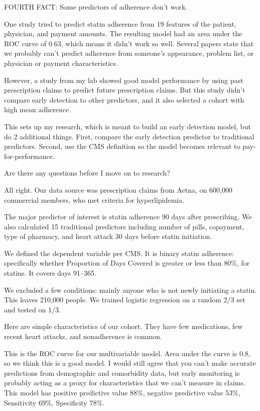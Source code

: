\documentclass[12pt]{report}
\begin{document}
\begin{large}
FOURTH FACT: Some predictors of adherence don't work. %

One study tried to predict statin adherence from 19 features of the
patient, physician, and payment amounts. The resulting model had an
area under the ROC curve of 0.63, which means it didn't work so well.
Several papers state that we probably can't predict adherence from
someone's appearance, problem list, or physician or payment
characteristics. %

However, a study from my lab showed good model performance by using
past prescription claims to predict future prescription claims. But
this study didn't compare early detection to other predictors, and it
also selected a cohort with high mean adherence. %

This sets up my research, which is meant to build an early detection
model, but do 2 additional things. First, compare the early detection
predictor to traditional predictors. Second, use the CMS definition so
the model becomes relevant to pay-for-performance.

Are there any questions before I move on to research?







All right. Our data source was prescription claims from Aetna, on
600,000 commercial members, who met criteria for hyperlipidemia. %

The major predictor of interest is statin adherence 90 days after
prescribing. We also calculated 15 traditional predictors including
number of pills, copayment, type of pharmacy, and heart attack 30 days
before statin initiation.


We defined the dependent variable per CMS. It is binary statin
adherence: specifically whether Proportion of Days Covered is greater
or less than 80\%, for statins. It covers days 91--365.

We excluded a few conditions: mainly anyone who is not newly
initiating a statin. This leaves 210,000 people. We trained logistic
regression on a random 2/3 set and tested on 1/3. %

Here are simple characteristics of our cohort. They have few
medications, few recent heart attacks, and nonadherence is common.

This is the ROC curve for our multivariable model. Area under the
curve is 0.8, so we think this is a good model. I would still agree
that you can't make accurate predictions from demographic and
comorbidity data, but early monitoring is probably acting as a proxy
for characteristics that we can't measure in claims. This model has
positive predictive value 88\%, negative predictive value 53\%,
Sensitivity 69\%, Specificity 78\%.


\end{large}
\end{document}
